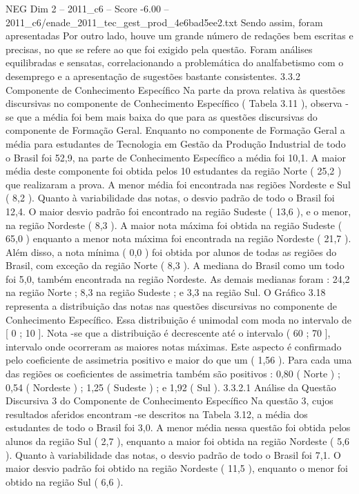 \begin{textsample}{NEG Dim 2 – 2011\_c6 – Score -6.00 – 2011\_c6/enade\_2011\_tec\_gest\_prod\_4e6bad5ee2.txt}
Sendo assim, foram apresentadas Por outro lado, houve um grande número de redações bem escritas e precisas, no que se refere ao que foi exigido pela questão.
Foram análises equilibradas e sensatas, correlacionando a problemática do analfabetismo com o desemprego e a apresentação de sugestões bastante consistentes. 3.3.2 Componente de Conhecimento Específico Na parte da prova relativa às questões discursivas no componente de Conhecimento Específico ( Tabela 3.11 ), observa -se que a média foi bem mais baixa do que para as questões discursivas do componente de Formação Geral.
Enquanto no componente de Formação Geral a média para estudantes de Tecnologia em Gestão da Produção Industrial de todo o Brasil foi 52,9, na parte de Conhecimento Específico a média foi 10,1.
A maior média deste componente foi obtida pelos 10 estudantes da região Norte ( 25,2 ) que realizaram a prova.
A menor média foi encontrada nas regiões Nordeste e Sul ( 8,2 ).
Quanto à variabilidade das notas, o desvio padrão de todo o Brasil foi 12,4.
O maior desvio padrão foi encontrado na região Sudeste ( 13,6 ), e o menor, na região Nordeste ( 8,3 ).
A maior nota máxima foi obtida na região Sudeste ( 65,0 ) enquanto a menor nota máxima foi encontrada na região Nordeste ( 21,7 ).
Além disso, a nota mínima ( 0,0 ) foi obtida por alunos de todas as regiões do Brasil, com exceção da região Norte ( 8,3 ).
A mediana do Brasil como um todo foi 5,0, também encontrada na região Nordeste.
As demais medianas foram : 24,2 na região Norte ; 8,3 na região Sudeste ; e 3,3 na região Sul.
O Gráfico 3.18 representa a distribuição das notas nas questões discursivas no componente de Conhecimento Específico.
Essa distribuição é unimodal com moda no intervalo de [ 0 ; 10 ].
Nota -se que a distribuição é decrescente até o intervalo ( 60 ; 70 ], intervalo onde ocorreram as maiores notas máximas.
Este aspecto é confirmado pelo coeficiente de assimetria positivo e maior do que um ( 1,56 ).
Para cada uma das regiões os coeficientes de assimetria também são positivos : 0,80 ( Norte ) ; 0,54 ( Nordeste ) ; 1,25 ( Sudeste ) ; e 1,92 ( Sul ). 3.3.2.1 Análise da Questão Discursiva 3 do Componente de Conhecimento Específico Na questão 3, cujos resultados aferidos encontram -se descritos na Tabela 3.12, a média dos estudantes de todo o Brasil foi 3,0.
A menor média nessa questão foi obtida pelos alunos da região Sul ( 2,7 ), enquanto a maior foi obtida na região Nordeste ( 5,6 ).
Quanto à variabilidade das notas, o desvio padrão de todo o Brasil foi 7,1.
O maior desvio padrão foi obtido na região Nordeste ( 11,5 ), enquanto o menor foi obtido na região Sul ( 6,6 ).

\end{textsample}
